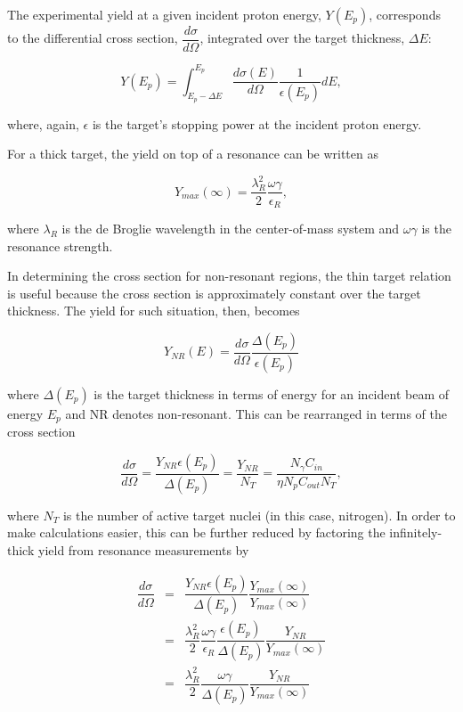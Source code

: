 The experimental yield at a given incident proton energy, $Y(E_{p})$, corresponds to the differential cross section, $\dfrac{d \sigma}{d \Omega}$, integrated over the target thickness, $\Delta E$:

\begin{equation}
Y(E_{p}) = \int_{E_{p} - \Delta E}^{E_{p}} \dfrac{d \sigma(E)}{d \Omega} \dfrac{1}{\epsilon(E_{p})} dE,
\label{eqn: yieldCS}
\end{equation}

\noindent where, again, $\epsilon$ is the target's stopping power at the incident proton energy. 

For a thick target, the yield on top of a resonance can be written as

\begin{equation}
Y_{max}(\infty) = \dfrac{\lambda_{R}^{2}}{2} \dfrac{\omega \gamma}{\epsilon_{R}},
\end{equation}

\noindent where $\lambda_{R}$ is the de Broglie wavelength in the center-of-mass system and $\omega \gamma$ is the resonance strength. 



In determining the cross section for non-resonant regions, the thin target relation is useful because the cross section is approximately constant over the target thickness. The yield for such situation, then, becomes

\begin{equation}
Y_{NR}(E) = \dfrac{d \sigma}{d \Omega} \dfrac{\Delta(E_{p})}{\epsilon(E_{p})}
\end{equation}

\noindent where $\Delta(E_{p})$ is the target thickness in terms of energy for an incident beam of energy $E_{p}$ and NR denotes non-resonant. This can be rearranged in terms of the cross section

\begin{equation}
\dfrac{d \sigma}{d \Omega} = \dfrac{Y_{NR} \epsilon(E_{p})}{\Delta(E_{p})} = \dfrac{Y_{NR}}{N_{T}} = \dfrac{N_{\gamma}C_{in}} {\eta  N_{p} C_{out} N_{T}},
\label{eqn: thinTargetCS}
\end{equation}

\noindent where $N_{T}$ is the number of active target nuclei (in this case, nitrogen). In order to make calculations easier, this can be further reduced by factoring the infinitely-thick yield from resonance measurements by

\begin{eqnarray}
\dfrac{d \sigma}{d \Omega} &=& \dfrac{Y_{NR} \epsilon(E_{p})}{\Delta(E_{p})} \dfrac{Y_{max}(\infty)}{Y_{max}(\infty)} \\
   &=& \dfrac{\lambda_{R}^{2}}{2} \dfrac{\omega \gamma}{\epsilon_{R}} \dfrac{\epsilon(E_{p})}{\Delta(E_{p})} \dfrac{Y_{NR}}{Y_{max}(\infty)} \\
   &=& \dfrac{\lambda_{R}^{2}}{2} \dfrac{\omega \gamma}{\Delta(E_{p})} \dfrac{Y_{NR}}{Y_{max}(\infty)} 
\end{eqnarray}


